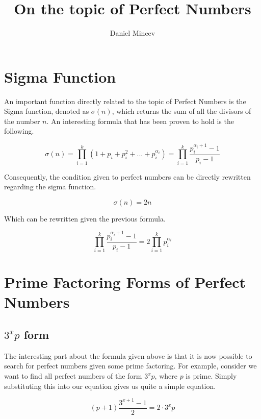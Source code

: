 \documentclass{article}
\title{On the topic of Perfect Numbers}
\author{Daniel Mineev}
\begin{document}
\maketitle

\section{Sigma Function}

An important function directly related to the topic of Perfect Numbers is the Sigma function, denoted as \(\sigma(n)\), which returns the sum of all the divisors of the number \(n\). An interesting formula that has been proven to hold is the following.

\begin{equation}
	\sigma(n) = \prod_{i = 1}^k \left (1 + p_i + p_i^2 + ... + p_i^{\alpha_i} \right ) = \prod_{i = 1}^k \frac{p_i^{\alpha_i + 1} - 1}{p_i - 1}
\end{equation}

Consequently, the condition given to perfect numbers can be directly rewritten regarding the sigma function.

\begin{equation}
	\sigma(n) = 2n
\end{equation}

Which can be rewritten given the previous formula.

\begin{equation}
	\prod_{i = 1}^k \frac{p_i^{\alpha_i + 1} - 1}{p_i - 1} = 2\prod_{i = 1}^k p_i^{\alpha_i}
\end{equation}

\section{Prime Factoring Forms of Perfect Numbers}

\subsection{\(3^x p\) form}

The interesting part about the formula given above is that it is now possible to search for perfect numbers given some prime factoring. For example, consider we want to find all perfect numbers of the form \(3^x p\), where \(p\) is prime. Simply substituting this into our equation gives us quite a simple equation.

\begin{equation}
	(p + 1) \frac{3^{x + 1} - 1}{2} = 2 \cdot 3^x p
\end{equation}
\end{document}
